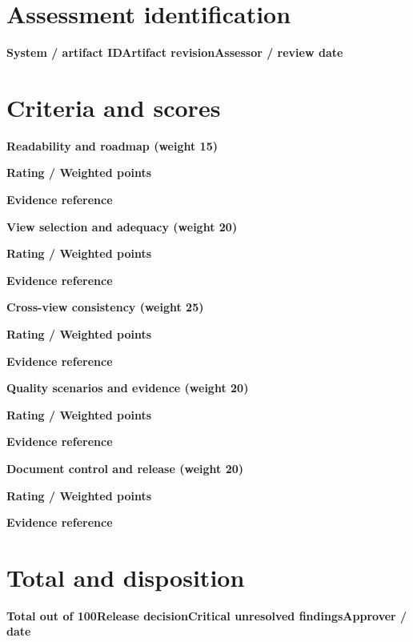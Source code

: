 \documentclass[10pt,letterpaper]{article}
\begin{document}
\DocProvenance
\section{Assessment identification}
\textbf{System / artifact ID}\textbf{Artifact revision}\textbf{Assessor / review date}
\section{Criteria and scores}
\textbf{Readability and roadmap (weight 15)}\par\textbf{Rating / Weighted points}\par{}\textbf{Evidence reference}\par{}
\textbf{View selection and adequacy (weight 20)}\par\textbf{Rating / Weighted points}\par{}\textbf{Evidence reference}\par{}
\textbf{Cross-view consistency (weight 25)}\par\textbf{Rating / Weighted points}\par{}\textbf{Evidence reference}\par{}
\textbf{Quality scenarios and evidence (weight 20)}\par\textbf{Rating / Weighted points}\par{}\textbf{Evidence reference}\par{}
\textbf{Document control and release (weight 20)}\par\textbf{Rating / Weighted points}\par{}\textbf{Evidence reference}\par{}
\section{Total and disposition}
\textbf{Total out of 100}\textbf{Release decision}\textbf{Critical unresolved findings}\textbf{Approver / date}
\end{document}
